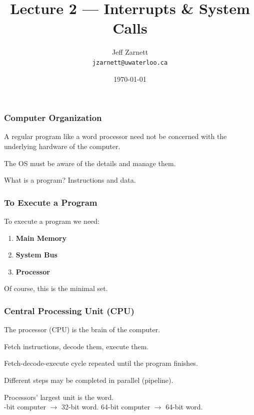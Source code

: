 

\title{Lecture 2 --- Interrupts \& System Calls }

\author{Jeff Zarnett \\ \small \texttt{jzarnett@uwaterloo.ca}}
\date{\today}




\begin{frame}
  \titlepage

 \end{frame}

\begin{frame}
\frametitle{Computer Organization}

A regular program like a word processor need not be concerned with the underlying hardware of the computer.

The OS must be aware of the details and manage them.

What is a program? Instructions and data.


\end{frame}

\begin{frame}
\frametitle{To Execute a Program}

To execute a program we need:

\begin{enumerate}
	\item \textbf{Main Memory}
	\item \textbf{System Bus}
	\item \textbf{Processor}
\end{enumerate}

Of course, this is the minimal set.

\end{frame}


\begin{frame}
\frametitle{Central Processing Unit (CPU)}

The processor (CPU) is the brain of the computer.

Fetch instructions, decode them, execute them.

Fetch-decode-execute cycle repeated until the program finishes.

Different steps may be completed in parallel (\alert{pipeline}).

Processors' largest unit is the \alert{word}.\\
-bit computer $\rightarrow$ 32-bit word. 64-bit computer $\rightarrow$ 64-bit word.

\end{frame}

